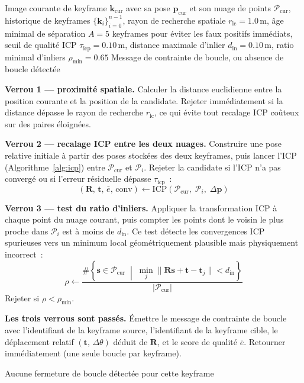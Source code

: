 \documentclass[12pt,a4paper]{report}
\begin{document}
\begin{algorithm}[H]
  \caption{Détection de fermeture de boucle LiDAR avec une pipeline à trois verrous}\label{alg:lidar-lc}
  \begin{algorithmic}[1]
    \Require Image courante de keyframe $\mathbf{k}_{\text{cur}}$ avec sa pose $\mathbf{p}_{\text{cur}}$
    et son nuage de points $\mathcal{P}_{\text{cur}}$,
    historique de keyframes $\{\mathbf{k}_i\}_{i=0}^{n-1}$,
    rayon de recherche spatiale $r_{\text{lc}} = 1.0\,\text{m}$,
    âge minimal de séparation $A = 5$ keyframes pour éviter les faux positifs immédiats,
    seuil de qualité ICP $\tau_{\text{icp}} = 0.10\,\text{m}$,
    distance maximale d'inlier $d_{\text{in}} = 0.10\,\text{m}$,
    ratio minimal d'inliers $\rho_{\min} = 0.65$
    \Ensure  Message de contrainte de boucle, ou absence de boucle détectée


    \State \textbf{Verrou 1 — proximité spatiale.}
    Calculer la distance euclidienne entre la position courante et la position de la candidate.
    Rejeter immédiatement si la distance dépasse le rayon de recherche $r_{\text{lc}}$,
    ce qui évite tout recalage ICP coûteux sur des paires éloignées.

    \State \textbf{Verrou 2 — recalage ICP entre les deux nuages.}
    Construire une pose relative initiale à partir des poses stockées des deux keyframes,
    puis lancer l'ICP (Algorithme~\ref{alg:icp}) entre $\mathcal{P}_{\text{cur}}$ et $\mathcal{P}_i$.
    Rejeter la candidate si l'ICP n'a pas convergé ou si l'erreur résiduelle dépasse $\tau_{\text{icp}}$~:
    \[
      (\mathbf{R},\, \mathbf{t},\, \bar{e},\, \text{conv})
      \gets \mathrm{ICP}(\mathcal{P}_{\text{cur}},\; \mathcal{P}_i,\; \Delta\mathbf{p})
    \]

    \State \textbf{Verrou 3 — test du ratio d'inliers.}
    Appliquer la transformation ICP à chaque point du nuage courant,
    puis compter les points dont le voisin le plus proche dans $\mathcal{P}_i$
    est à moins de $d_{\text{in}}$. Ce test détecte les convergences ICP spurieuses
    vers un minimum local géométriquement plausible mais physiquement incorrect~:
    \[
      \rho \gets \frac{\#\left\{\mathbf{s} \in \mathcal{P}_{\text{cur}} \;\middle|\;
      \min_{j}\|\mathbf{R}\mathbf{s} + \mathbf{t} - \mathbf{t}_j\| < d_{\text{in}}\right\}}
      {|\mathcal{P}_{\text{cur}}|}
    \]
    Rejeter si $\rho < \rho_{\min}$.

    \State \textbf{Les trois verrous sont passés.}
    Émettre le message de contrainte de boucle avec l'identifiant de la keyframe source,
    l'identifiant de la keyframe cible, le déplacement relatif $(\mathbf{t},\, \Delta\theta)$
    déduit de $\mathbf{R}$, et le score de qualité $\bar{e}$.
    Retourner immédiatement (une seule boucle par keyframe).

    \EndFor

    \State Aucune fermeture de boucle détectée pour cette keyframe
  \end{algorithmic}
\end{algorithm}
\end{document}
